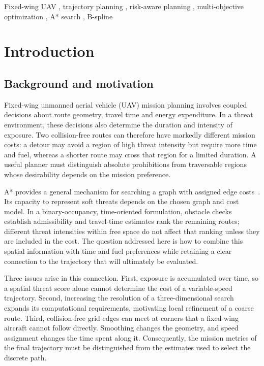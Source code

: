 \documentclass[preprint,12pt]{elsarticle}
\begin{document}
\begin{frontmatter}
\begin{keyword}
Fixed-wing UAV \sep
trajectory planning \sep
risk-aware planning \sep
multi-objective optimization \sep
A* search \sep
B-spline

\end{keyword}

\end{frontmatter}

\section{Introduction}
\label{sec:introduction}

\subsection{Background and motivation}
\label{sec:motivation}

Fixed-wing unmanned aerial vehicle (UAV) mission planning involves coupled
decisions about route geometry, travel time and energy expenditure. In a
threat environment, these decisions also determine the duration and
intensity of exposure. Two collision-free routes can therefore have markedly
different mission costs: a detour may avoid a region of high threat intensity
but require more time and fuel, whereas a shorter route may cross that
region for a limited duration. A useful planner must distinguish absolute
prohibitions from traversable regions whose desirability depends on the
mission preference.

A* provides a general mechanism for searching a graph with assigned edge
costs~\cite{hart1968}. Its capacity to represent soft threats depends on the
chosen graph and cost model. In a binary-occupancy, time-oriented formulation,
obstacle checks establish admissibility and travel-time estimates rank the
remaining routes; different threat intensities within free space do not
affect that ranking unless they are included in the cost. The question
addressed here is how to combine this spatial information with time and
fuel preferences while retaining a clear connection to the trajectory
that will ultimately be evaluated.

Three issues arise in this connection. First, exposure is accumulated over
time, so a spatial threat score alone cannot determine the cost of a
variable-speed trajectory. Second, increasing the resolution of a
three-dimensional search expands its computational requirements, motivating
local refinement of a coarse route. Third, collision-free grid edges can
meet at corners that a fixed-wing aircraft cannot follow directly.
Smoothing changes the geometry, and speed assignment changes the time spent
along it. Consequently, the mission metrics of the final trajectory must
be distinguished from the estimates used to select the discrete path.
\end{document}
